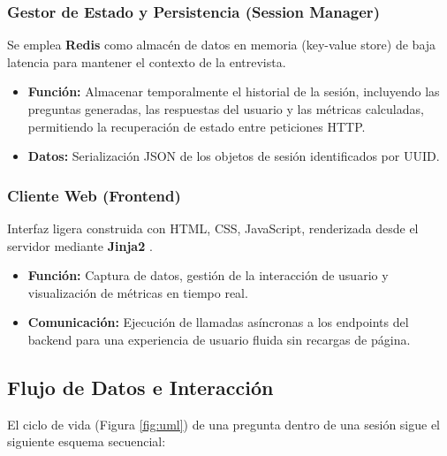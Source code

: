 \documentclass[12pt, a4paper]{article}
\begin{document}
\subsubsection{Gestor de Estado y Persistencia (Session Manager)}
Se emplea \textbf{Redis} \cite{redis2024} como almacén de datos en memoria (key-value store) de baja latencia para mantener el contexto de la entrevista.
\begin{itemize}
    \item \textbf{Función:} Almacenar temporalmente el historial de la sesión, incluyendo las preguntas generadas, las respuestas del usuario y las métricas calculadas, permitiendo la recuperación de estado entre peticiones HTTP.
    \item \textbf{Datos:} Serialización JSON de los objetos de sesión identificados por UUID.
\end{itemize}

\subsubsection{Cliente Web (Frontend)}
Interfaz ligera construida con HTML, CSS, JavaScript, renderizada desde el servidor mediante \textbf{Jinja2} \cite{ronacher2008jinja2}.
\begin{itemize}
    \item \textbf{Función:} Captura de datos, gestión de la interacción de usuario y visualización de métricas en tiempo real.
    \item \textbf{Comunicación:} Ejecución de llamadas asíncronas a los endpoints del backend para una experiencia de usuario fluida sin recargas de página.
\end{itemize}

\subsection{Flujo de Datos e Interacción}

El ciclo de vida (Figura \ref{fig:uml}) de una pregunta dentro de una sesión sigue el siguiente esquema secuencial:
\end{document}

